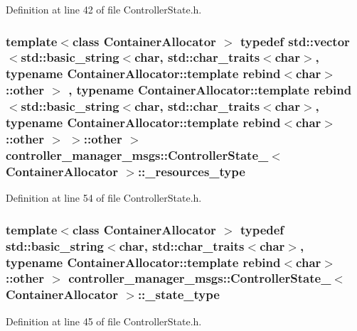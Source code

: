 \-Definition at line 42 of file \-Controller\-State.\-h.

\subsubsection[{\-\_\-resources\-\_\-type}]{\setlength{\rightskip}{0pt plus 5cm}template$<$class Container\-Allocator $>$ typedef std\-::vector$<$std\-::basic\-\_\-string$<$char, std\-::char\-\_\-traits$<$char$>$, typename \-Container\-Allocator\-::template rebind$<$char$>$\-::other $>$ , typename \-Container\-Allocator\-::template rebind$<$std\-::basic\-\_\-string$<$char, std\-::char\-\_\-traits$<$char$>$, typename \-Container\-Allocator\-::template rebind$<$char$>$\-::other $>$ $>$\-::other $>$ {\bf controller\-\_\-manager\-\_\-msgs\-::\-Controller\-State\-\_\-}$<$ \-Container\-Allocator $>$\-::{\bf \-\_\-resources\-\_\-type}}\label{structcontroller__manager__msgs_1_1ControllerState___a6c48a82781ef63e1639ef3d35c0e1fd7}


\-Definition at line 54 of file \-Controller\-State.\-h.

\subsubsection[{\-\_\-state\-\_\-type}]{\setlength{\rightskip}{0pt plus 5cm}template$<$class Container\-Allocator $>$ typedef std\-::basic\-\_\-string$<$char, std\-::char\-\_\-traits$<$char$>$, typename \-Container\-Allocator\-::template rebind$<$char$>$\-::other $>$ {\bf controller\-\_\-manager\-\_\-msgs\-::\-Controller\-State\-\_\-}$<$ \-Container\-Allocator $>$\-::{\bf \-\_\-state\-\_\-type}}\label{structcontroller__manager__msgs_1_1ControllerState___a75b5d73b5fde4040f9bffcad657b655e}


\-Definition at line 45 of file \-Controller\-State.\-h.

